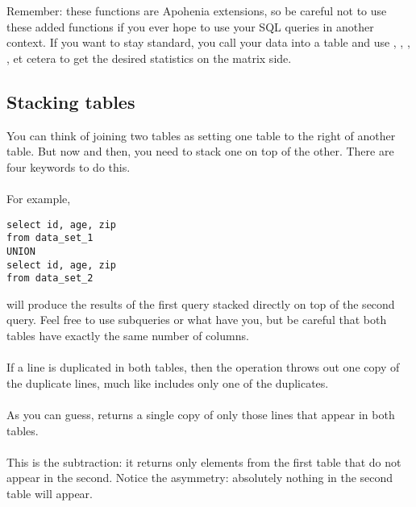Remember: these functions are Apohenia extensions, so be careful not to
use these added functions if you ever hope to use your SQL queries in
another context. If you want to stay standard, you call your data into
a table and use , ,
, , et cetera to get the desired
statistics on the matrix side.

\subsection{Stacking tables}
You can think of joining two tables as setting one table to the right of
another table. But now and then, you need to stack one on top of
the other. There are four keywords to do this.

\paragraph{} For example, 
\begin{lstlisting}
select id, age, zip
from data_set_1
UNION
select id, age, zip
from data_set_2
\end{lstlisting}
will produce the results of the first query stacked directly on top of
the second query. Feel free to use subqueries or what have you, but be
careful that both tables have exactly the same number of columns.

\paragraph{} If a line is duplicated in both tables,
then the  operation throws out
one copy of the duplicate lines, much like 
includes only one of the duplicates.

\paragraph{} As you can guess,  returns
a single copy of only those lines that appear in both tables.

\paragraph{} This is the subtraction: it returns only
elements from the first table that do not appear in the second. Notice
the asymmetry: absolutely nothing in the second table will appear. 

